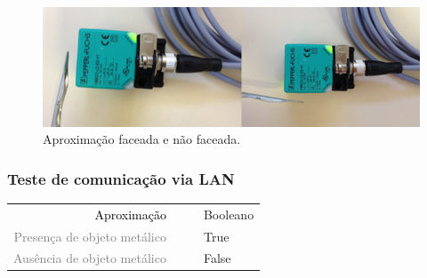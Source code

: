 \begin{figure}[h!]
 \centering
 \includegraphics[width=1\columnwidth]{indutivo/figs/indutivo_faceado.png}
 \caption{Aproximação faceada e não faceada.}
 \label{fig:indu_fac}
 \end{figure}
 
 \subsubsection{Teste de comunicação via LAN}
   \begin{table}[H]
	\begin{tabular}{r l|l p{12cm} }
		\textcolor{black}{Aproximação} &&& 	{Booleano}\\
		\textcolor{gray}{Presença de objeto metálico} &&& 				{True}\\
		\textcolor{gray}{Ausência de objeto metálico} &&& 				{False}\\
 	\end{tabular}
\end{table}
 
 
\label{dados}




  